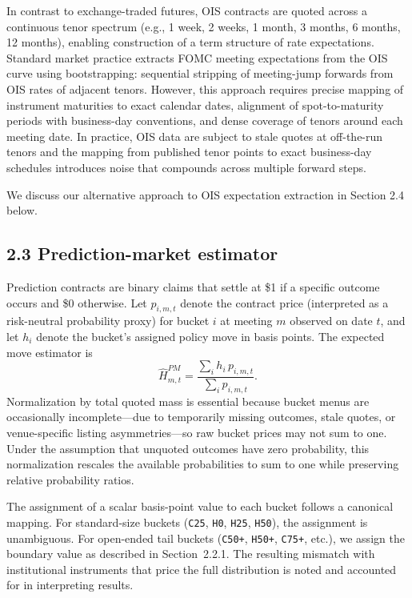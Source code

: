 In contrast to exchange-traded futures, OIS contracts are quoted across a continuous tenor spectrum (e.g., 1 week, 2 weeks, 1 month, 3 months, 6 months, 12 months), enabling construction of a term structure of rate expectations. Standard market practice extracts FOMC meeting expectations from the OIS curve using bootstrapping: sequential stripping of meeting-jump forwards from OIS rates of adjacent tenors. However, this approach requires precise mapping of instrument maturities to exact calendar dates, alignment of spot-to-maturity periods with business-day conventions, and dense coverage of tenors around each meeting date. In practice, OIS data are subject to stale quotes at off-the-run tenors and the mapping from published tenor points to exact business-day schedules introduces noise that compounds across multiple forward steps.

We discuss our alternative approach to OIS expectation extraction in Section 2.4 below.

\subsection*{2.3 Prediction-market estimator}

Prediction contracts are binary claims that settle at \$1 if a specific outcome occurs and \$0 otherwise. Let $p_{i,m,t}$ denote the contract price (interpreted as a risk-neutral probability proxy) for bucket $i$ at meeting $m$ observed on date $t$, and let $h_i$ denote the bucket's assigned policy move in basis points. The expected move estimator is
\[
\widehat{H}^{PM}_{m,t}=\frac{\sum_i h_i\,p_{i,m,t}}{\sum_i p_{i,m,t}}.
\]
Normalization by total quoted mass is essential because bucket menus are occasionally incomplete---due to temporarily missing outcomes, stale quotes, or venue-specific listing asymmetries---so raw bucket prices may not sum to one. Under the assumption that unquoted outcomes have zero probability, this normalization rescales the available probabilities to sum to one while preserving relative probability ratios.

The assignment of a scalar basis-point value to each bucket follows a canonical mapping. For standard-size buckets (\texttt{C25}, \texttt{H0}, \texttt{H25}, \texttt{H50}), the assignment is unambiguous. For open-ended tail buckets (\texttt{C50+}, \texttt{H50+}, \texttt{C75+}, etc.), we assign the boundary value as described in Section~2.2.1. The resulting mismatch with institutional instruments that price the full distribution is noted and accounted for in interpreting results.

